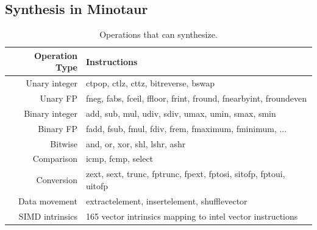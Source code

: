 \subsection{Synthesis in Minotaur}

\begin{table}[bp]
  \centering
  \caption{Operations that \minotaur{} can synthesize.}
  \begin{tabular}{ r | l }
    \textbf{Operation Type} & \textbf{Instructions} \\
    \hline
    Unary integer & ctpop, ctlz, cttz, bitreverse, bswap \\
    Unary FP & fneg, fabs, fceil, ffloor, frint, fround, fnearbyint, froundeven \\
    Binary integer & add, sub, mul, udiv, sdiv, umax, umin, smax, smin\\
    Binary FP & fadd, fsub, fmul, fdiv, frem, fmaximum, fminimum, ... \\
    Bitwise & and, or, xor, shl, lshr, ashr \\
    Comparison & icmp, fcmp, select \\
    Conversion & zext, sext, trunc, fptrunc, fpext, fptosi, sitofp, fptoui, uitofp \\
    Data movement & extractelement, insertelement, shufflevector \\
    SIMD intrinsics & 165 vector intrinsics mapping to intel vector instructions \\
  \end{tabular}
  \label{tab:operations}
\end{table}

